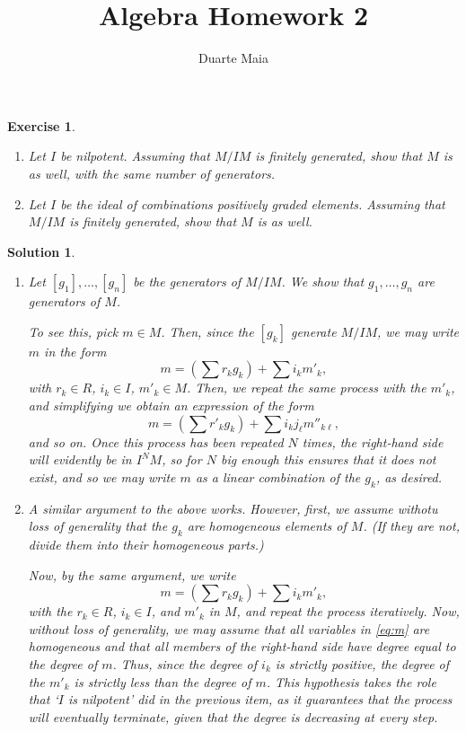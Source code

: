\documentclass{article}
\title{Algebra Homework 2}
\author{Duarte Maia}
\newtheorem{ex}{Exercise}
\theoremstyle{nonumberplain}
\newtheorem{sol}{Solution}
\begin{document}
\maketitle

\begin{ex}
\leavevmode
\begin{enumerate}
\item Let $I$ be nilpotent. Assuming that $M/IM$ is finitely generated, show that $M$ is as well, with the same number of generators.
\item Let $I$ be the ideal of combinations positively graded elements. Assuming that $M/IM$ is finitely generated, show that $M$ is as well.
\end{enumerate}
\end{ex}

\begin{sol}
\leavevmode
\begin{enumerate}
\item Let $[g_1], \dots, [g_n]$ be the generators of $M/IM$. We show that $g_1, \dots, g_n$ are generators of $M$.

To see this, pick $m \in M$. Then, since the $[g_k]$ generate $M/IM$, we may write $m$ in the form
\begin{equation}
m = \left( \sum r_k g_k \right) + \sum i_k m'_k,
\end{equation}
with $r_k \in R$, $i_k \in I$, $m'_k \in M$. Then, we repeat the same process with the $m'_k$, and simplifying we obtain an expression of the form
\begin{equation}
m = \left( \sum r'_k g_k \right) + \sum i_k j_\ell m''_{k\ell},
\end{equation}
and so on. Once this process has been repeated $N$ times, the right-hand side will evidently be in $I^N M$, so for $N$ big enough this ensures that it does not exist, and so we may write $m$ as a linear combination of the $g_k$, as desired.

\item A similar argument to the above works. However, first, we assume withotu loss of generality that the $g_k$ are homogeneous elements of $M$. (If they are not, divide them into their homogeneous parts.)

Now, by the same argument, we write
\begin{equation}\label{eq:m}
m = \left( \sum r_k g_k \right) + \sum i_k m'_k,
\end{equation}
with the $r_k \in R$, $i_k \in I$, and $m'_k$ in $M$, and repeat the process iteratively. Now, without loss of generality, we may assume that all variables in \eqref{eq:m} are homogeneous and that all members of the right-hand side have degree equal to the degree of $m$. Thus, since the degree of $i_k$ is strictly positive, the degree of the $m'_k$ is strictly less than the degree of $m$. This hypothesis takes the role that `$I$ is nilpotent' did in the previous item, as it guarantees that the process will eventually terminate, given that the degree is decreasing at every step.
\end{enumerate}
\end{sol}
\end{document}
